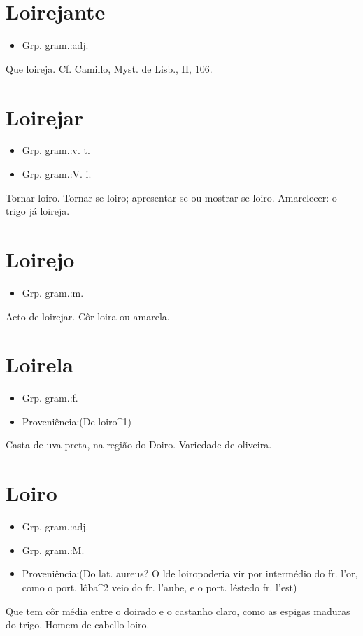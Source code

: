 \section{Loirejante}
\begin{itemize}
\item {Grp. gram.:adj.}
\end{itemize}
Que loireja. Cf. Camillo, \textunderscore Myst. de Lisb.\textunderscore , II, 106.
\section{Loirejar}
\begin{itemize}
\item {Grp. gram.:v. t.}
\end{itemize}
\begin{itemize}
\item {Grp. gram.:V. i.}
\end{itemize}
Tornar loiro.
Tornar se loiro; apresentar-se ou mostrar-se loiro.
Amarelecer: \textunderscore o trigo já loireja\textunderscore .
\section{Loirejo}
\begin{itemize}
\item {Grp. gram.:m.}
\end{itemize}
Acto de loirejar.
Côr loira ou amarela.
\section{Loirela}
\begin{itemize}
\item {Grp. gram.:f.}
\end{itemize}
\begin{itemize}
\item {Proveniência:(De \textunderscore loiro\textunderscore ^1)}
\end{itemize}
Casta de uva preta, na região do Doiro.
Variedade de oliveira.
\section{Loiro}
\begin{itemize}
\item {Grp. gram.:adj.}
\end{itemize}
\begin{itemize}
\item {Grp. gram.:M.}
\end{itemize}
\begin{itemize}
\item {Proveniência:(Do lat. \textunderscore aureus\textunderscore ? O \textunderscore l\textunderscore  de \textunderscore loiro\textunderscore  poderia vir por intermédio do fr. \textunderscore l'or\textunderscore , como o port. \textunderscore lôba\textunderscore ^2 veio do fr. \textunderscore l'aube\textunderscore , e o port. \textunderscore léste\textunderscore  do fr. \textunderscore l'est\textunderscore )}
\end{itemize}
Que tem côr média entre o doirado e o castanho claro, como as espigas maduras do trigo.
Homem de cabello loiro.
